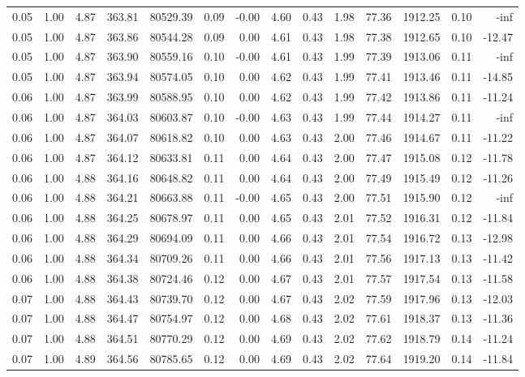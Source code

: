 \begin{table}[!ht]
\begin{tabular}{rrrrrrrrrrrrrr}
0.05 & 1.00 & 4.87 & 363.81 & 80529.39 & 0.09 & -0.00 & 4.60 & 0.43 & 1.98 & 77.36 & 1912.25 & 0.10 & -inf \\
0.05 & 1.00 & 4.87 & 363.86 & 80544.28 & 0.09 & 0.00 & 4.61 & 0.43 & 1.98 & 77.38 & 1912.65 & 0.10 & -12.47 \\
0.05 & 1.00 & 4.87 & 363.90 & 80559.16 & 0.10 & -0.00 & 4.61 & 0.43 & 1.99 & 77.39 & 1913.06 & 0.11 & -inf \\
0.05 & 1.00 & 4.87 & 363.94 & 80574.05 & 0.10 & 0.00 & 4.62 & 0.43 & 1.99 & 77.41 & 1913.46 & 0.11 & -14.85 \\
0.06 & 1.00 & 4.87 & 363.99 & 80588.95 & 0.10 & 0.00 & 4.62 & 0.43 & 1.99 & 77.42 & 1913.86 & 0.11 & -11.24 \\
0.06 & 1.00 & 4.87 & 364.03 & 80603.87 & 0.10 & -0.00 & 4.63 & 0.43 & 1.99 & 77.44 & 1914.27 & 0.11 & -inf \\
0.06 & 1.00 & 4.87 & 364.07 & 80618.82 & 0.10 & 0.00 & 4.63 & 0.43 & 2.00 & 77.46 & 1914.67 & 0.11 & -11.22 \\
0.06 & 1.00 & 4.87 & 364.12 & 80633.81 & 0.11 & 0.00 & 4.64 & 0.43 & 2.00 & 77.47 & 1915.08 & 0.12 & -11.78 \\
0.06 & 1.00 & 4.88 & 364.16 & 80648.82 & 0.11 & 0.00 & 4.64 & 0.43 & 2.00 & 77.49 & 1915.49 & 0.12 & -11.26 \\
0.06 & 1.00 & 4.88 & 364.21 & 80663.88 & 0.11 & -0.00 & 4.65 & 0.43 & 2.00 & 77.51 & 1915.90 & 0.12 & -inf \\
0.06 & 1.00 & 4.88 & 364.25 & 80678.97 & 0.11 & 0.00 & 4.65 & 0.43 & 2.01 & 77.52 & 1916.31 & 0.12 & -11.84 \\
0.06 & 1.00 & 4.88 & 364.29 & 80694.09 & 0.11 & 0.00 & 4.66 & 0.43 & 2.01 & 77.54 & 1916.72 & 0.13 & -12.98 \\
0.06 & 1.00 & 4.88 & 364.34 & 80709.26 & 0.11 & 0.00 & 4.66 & 0.43 & 2.01 & 77.56 & 1917.13 & 0.13 & -11.42 \\
0.06 & 1.00 & 4.88 & 364.38 & 80724.46 & 0.12 & 0.00 & 4.67 & 0.43 & 2.01 & 77.57 & 1917.54 & 0.13 & -11.58 \\
0.07 & 1.00 & 4.88 & 364.43 & 80739.70 & 0.12 & 0.00 & 4.67 & 0.43 & 2.02 & 77.59 & 1917.96 & 0.13 & -12.03 \\
0.07 & 1.00 & 4.88 & 364.47 & 80754.97 & 0.12 & 0.00 & 4.68 & 0.43 & 2.02 & 77.61 & 1918.37 & 0.13 & -11.36 \\
0.07 & 1.00 & 4.88 & 364.51 & 80770.29 & 0.12 & 0.00 & 4.69 & 0.43 & 2.02 & 77.62 & 1918.79 & 0.14 & -11.24 \\
0.07 & 1.00 & 4.89 & 364.56 & 80785.65 & 0.12 & 0.00 & 4.69 & 0.43 & 2.02 & 77.64 & 1919.20 & 0.14 & -11.84 \\

\end{tabular}
\end{table}
